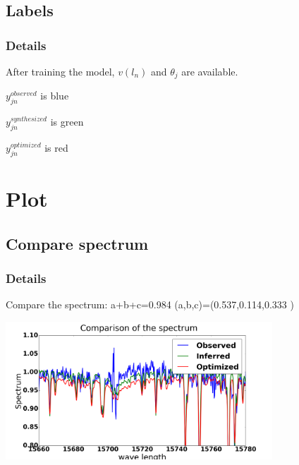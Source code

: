 \documentclass{beamer}
\begin{document}
\subsection{Labels} %

\begin{frame}
\frametitle{Details}

After training the model, \(v(l_n)\) and \(\theta_{j}\) are available.

\(y_{jn}^{observed}\) is blue



\(y_{jn}^{synthesized}\) is green



\(y_{jn}^{optimized}\) is red



\end{frame}




\section{Plot} %

\subsection{Compare spectrum} %

\begin{frame}
\frametitle{Details}
 
Compare the spectrum: a+b+c=0.984  (a,b,c)=(0.537,0.114,0.333 )


\includegraphics[width=100mm]{figure_1.png}




\end{frame}
\end{document}
